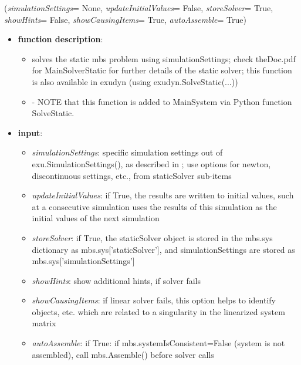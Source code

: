 \ei

%
\begin{flushleft}
\label{sec:mainsystemextensions:SolveStatic}
({\it simulationSettings}= None, {\it updateInitialValues}= False, {\it storeSolver}= True, {\it showHints}= False, {\it showCausingItems}= True, {\it autoAssemble}= True)
\end{flushleft}
\setlength{\itemindent}{0.7cm}
\begin{itemize}[leftmargin=0.7cm]
\item[--]
{\bf function description}: \vspace{-6pt}
\begin{itemize}[leftmargin=1.2cm]
\setlength{\itemindent}{-0.7cm}
\item[]solves the static mbs problem using simulationSettings; check theDoc.pdf for MainSolverStatic for further details of the static solver; this function is also available in exudyn (using exudyn.SolveStatic(...))
\item[]- NOTE that this function is added to MainSystem via Python function SolveStatic.
\end{itemize}
\item[--]
{\bf input}: \vspace{-6pt}
\begin{itemize}[leftmargin=1.2cm]
\setlength{\itemindent}{-0.7cm}
\item[]{\it simulationSettings}: specific simulation settings out of exu.SimulationSettings(), as described in ; use options for newton, discontinuous settings, etc., from staticSolver sub-items
\item[]{\it updateInitialValues}: if True, the results are written to initial values, such at a consecutive simulation uses the results of this simulation as the initial values of the next simulation
\item[]{\it storeSolver}: if True, the staticSolver object is stored in the mbs.sys dictionary as mbs.sys['staticSolver'], and simulationSettings are stored as mbs.sys['simulationSettings']
\item[]{\it showHints}: show additional hints, if solver fails
\item[]{\it showCausingItems}: if linear solver fails, this option helps to identify objects, etc. which are related to a singularity in the linearized system matrix
\item[]{\it autoAssemble}: if True: if mbs.systemIsConsistent=False (system is not assembled), call mbs.Assemble() before solver calls

\end{itemize}
\end{itemize}
